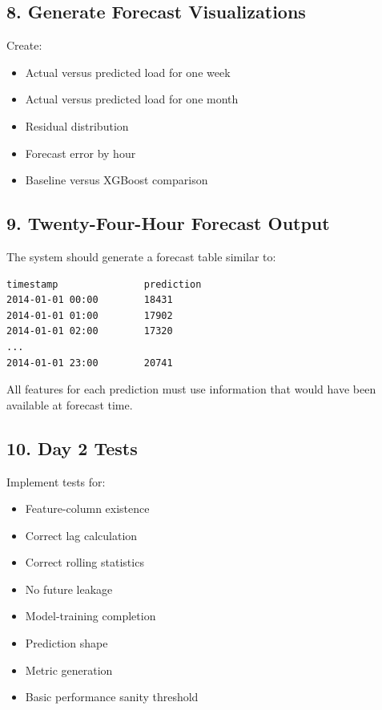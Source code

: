 \documentclass[11pt,a4paper]{article}
\begin{document}
\subsection{8. Generate Forecast Visualizations}

Create:

\begin{itemize}
    \item Actual versus predicted load for one week
    \item Actual versus predicted load for one month
    \item Residual distribution
    \item Forecast error by hour
    \item Baseline versus XGBoost comparison
\end{itemize}

\subsection{9. Twenty-Four-Hour Forecast Output}

The system should generate a forecast table similar to:

\begin{lstlisting}
timestamp               prediction
2014-01-01 00:00        18431
2014-01-01 01:00        17902
2014-01-01 02:00        17320
...
2014-01-01 23:00        20741
\end{lstlisting}

All features for each prediction must use information that would have been available at forecast time.

\subsection{10. Day 2 Tests}

Implement tests for:

\begin{itemize}
    \item Feature-column existence
    \item Correct lag calculation
    \item Correct rolling statistics
    \item No future leakage
    \item Model-training completion
    \item Prediction shape
    \item Metric generation
    \item Basic performance sanity threshold
\end{itemize}
\end{document}
